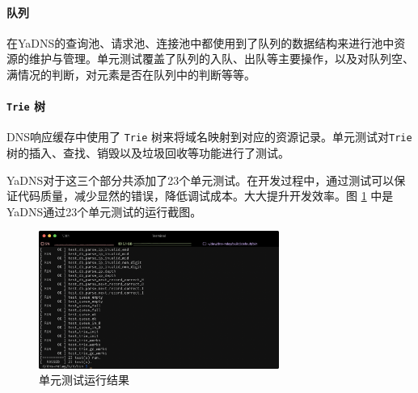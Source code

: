 \paragraph{队列} 在YaDNS的查询池、请求池、连接池中都使用到了队列的数据结构来进行池中资源的维护与管理。单元测试覆盖了队列的入队、出队等主要操作，以及对队列空、满情况的判断，对元素是否在队列中的判断等等。

\paragraph{\lstinline{Trie} 树} DNS响应缓存中使用了 \lstinline{Trie} 树来将域名映射到对应的资源记录。单元测试对\lstinline{Trie} 树的插入、查找、销毁以及垃圾回收等功能进行了测试。

YaDNS对于这三个部分共添加了23个单元测试。在开发过程中，通过测试可以保证代码质量，减少显然的错误，降低调试成本。大大提升开发效率。图 \ref{fig:unit-tests} 中是YaDNS通过23个单元测试的运行截图。

\begin{figure}[h]
  \centering
  \includegraphics[width=0.7\textwidth]{figures/unit_tests}
  \caption{单元测试运行结果}
  \label{fig:unit-tests}
\end{figure}

